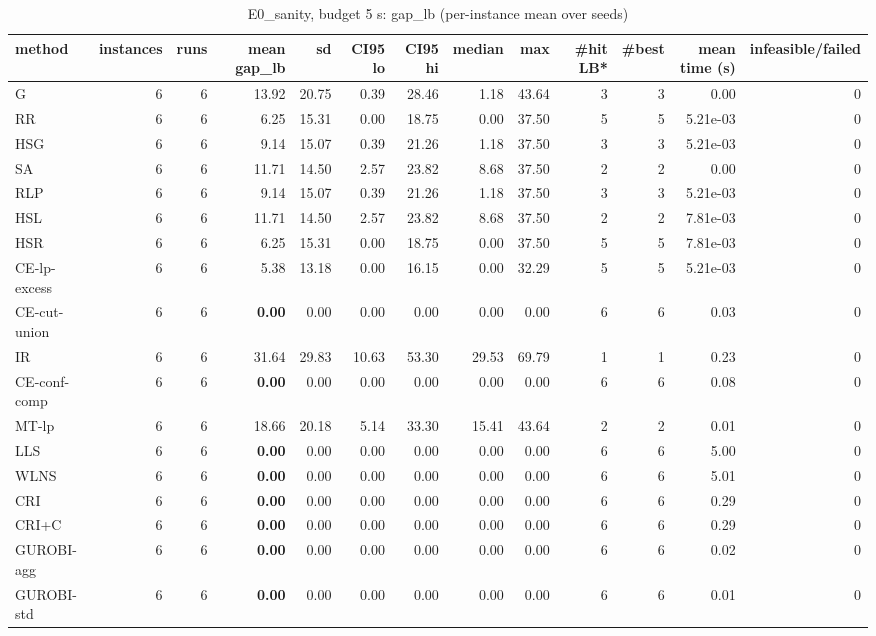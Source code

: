 \begin{table}[htbp]
\centering
\small
\caption{E0\_sanity, budget 5 s: gap\_lb (per-instance mean over seeds)}
\label{tab:E0_sanity_b5_summary}
\begin{tabular}{lrrrrrrrrrrrr}
\toprule
method & instances & runs & mean gap\_lb & sd & CI95 lo & CI95 hi & median & max & \#hit LB* & \#best & mean time (s) & infeasible/failed \\
\midrule
G & 6 & 6 & 13.92 & 20.75 & 0.39 & 28.46 & 1.18 & 43.64 & 3 & 3 & 0.00 & 0 \\
RR & 6 & 6 & 6.25 & 15.31 & 0.00 & 18.75 & 0.00 & 37.50 & 5 & 5 & 5.21e-03 & 0 \\
HSG & 6 & 6 & 9.14 & 15.07 & 0.39 & 21.26 & 1.18 & 37.50 & 3 & 3 & 5.21e-03 & 0 \\
SA & 6 & 6 & 11.71 & 14.50 & 2.57 & 23.82 & 8.68 & 37.50 & 2 & 2 & 0.00 & 0 \\
RLP & 6 & 6 & 9.14 & 15.07 & 0.39 & 21.26 & 1.18 & 37.50 & 3 & 3 & 5.21e-03 & 0 \\
HSL & 6 & 6 & 11.71 & 14.50 & 2.57 & 23.82 & 8.68 & 37.50 & 2 & 2 & 7.81e-03 & 0 \\
HSR & 6 & 6 & 6.25 & 15.31 & 0.00 & 18.75 & 0.00 & 37.50 & 5 & 5 & 7.81e-03 & 0 \\
CE-lp-excess & 6 & 6 & 5.38 & 13.18 & 0.00 & 16.15 & 0.00 & 32.29 & 5 & 5 & 5.21e-03 & 0 \\
CE-cut-union & 6 & 6 & \textbf{0.00} & 0.00 & 0.00 & 0.00 & 0.00 & 0.00 & 6 & 6 & 0.03 & 0 \\
IR & 6 & 6 & 31.64 & 29.83 & 10.63 & 53.30 & 29.53 & 69.79 & 1 & 1 & 0.23 & 0 \\
CE-conf-comp & 6 & 6 & \textbf{0.00} & 0.00 & 0.00 & 0.00 & 0.00 & 0.00 & 6 & 6 & 0.08 & 0 \\
MT-lp & 6 & 6 & 18.66 & 20.18 & 5.14 & 33.30 & 15.41 & 43.64 & 2 & 2 & 0.01 & 0 \\
LLS & 6 & 6 & \textbf{0.00} & 0.00 & 0.00 & 0.00 & 0.00 & 0.00 & 6 & 6 & 5.00 & 0 \\
WLNS & 6 & 6 & \textbf{0.00} & 0.00 & 0.00 & 0.00 & 0.00 & 0.00 & 6 & 6 & 5.01 & 0 \\
CRI & 6 & 6 & \textbf{0.00} & 0.00 & 0.00 & 0.00 & 0.00 & 0.00 & 6 & 6 & 0.29 & 0 \\
CRI+C & 6 & 6 & \textbf{0.00} & 0.00 & 0.00 & 0.00 & 0.00 & 0.00 & 6 & 6 & 0.29 & 0 \\
GUROBI-agg & 6 & 6 & \textbf{0.00} & 0.00 & 0.00 & 0.00 & 0.00 & 0.00 & 6 & 6 & 0.02 & 0 \\
GUROBI-std & 6 & 6 & \textbf{0.00} & 0.00 & 0.00 & 0.00 & 0.00 & 0.00 & 6 & 6 & 0.01 & 0 \\

\end{tabular}
\end{table}
